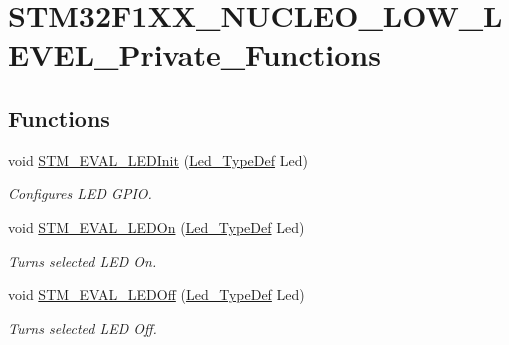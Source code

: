 \hypertarget{group___s_t_m32_f1_x_x___n_u_c_l_e_o___l_o_w___l_e_v_e_l___private___functions}{}\section{S\+T\+M32\+F1\+X\+X\+\_\+\+N\+U\+C\+L\+E\+O\+\_\+\+L\+O\+W\+\_\+\+L\+E\+V\+E\+L\+\_\+\+Private\+\_\+\+Functions}
\label{group___s_t_m32_f1_x_x___n_u_c_l_e_o___l_o_w___l_e_v_e_l___private___functions}
\subsection*{Functions}
\begin{DoxyCompactItemize}
\item 
void \mbox{\hyperlink{group___s_t_m32_f1_x_x___n_u_c_l_e_o___l_o_w___l_e_v_e_l___private___functions_ga01e1a245e786705357f741c8d42cbd3a}{S\+T\+M\+\_\+\+E\+V\+A\+L\+\_\+\+L\+E\+D\+Init}} (\mbox{\hyperlink{group___s_t_m32_f1_x_x___n_u_c_l_e_o___l_o_w___l_e_v_e_l___exported___types_gaa059704b7ca945eb9c1e7f2c3d03fecd}{Led\+\_\+\+Type\+Def}} Led)
\begin{DoxyCompactList}\small\item\em Configures L\+ED G\+P\+IO. \end{DoxyCompactList}\item 
void \mbox{\hyperlink{group___s_t_m32_f1_x_x___n_u_c_l_e_o___l_o_w___l_e_v_e_l___private___functions_gad27fa430d867e6dde94cb7896fcc42fc}{S\+T\+M\+\_\+\+E\+V\+A\+L\+\_\+\+L\+E\+D\+On}} (\mbox{\hyperlink{group___s_t_m32_f1_x_x___n_u_c_l_e_o___l_o_w___l_e_v_e_l___exported___types_gaa059704b7ca945eb9c1e7f2c3d03fecd}{Led\+\_\+\+Type\+Def}} Led)
\begin{DoxyCompactList}\small\item\em Turns selected L\+ED On. \end{DoxyCompactList}\item 
void \mbox{\hyperlink{group___s_t_m32_f1_x_x___n_u_c_l_e_o___l_o_w___l_e_v_e_l___private___functions_gab9ab7deafd606e72d72580ec974b7757}{S\+T\+M\+\_\+\+E\+V\+A\+L\+\_\+\+L\+E\+D\+Off}} (\mbox{\hyperlink{group___s_t_m32_f1_x_x___n_u_c_l_e_o___l_o_w___l_e_v_e_l___exported___types_gaa059704b7ca945eb9c1e7f2c3d03fecd}{Led\+\_\+\+Type\+Def}} Led)
\begin{DoxyCompactList}\small\item\em Turns selected L\+ED Off. \end{DoxyCompactList}\item 

\end{DoxyCompactItemize}
